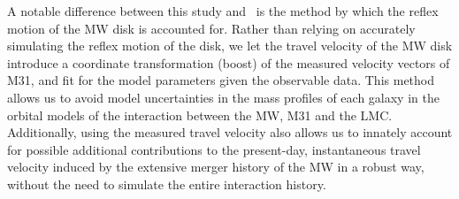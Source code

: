 \documentclass[twocolumn]{aastex631}
\begin{document}
A notable difference between this study and~\cite{Benisty2022} is the method by
which the reflex motion of the MW disk is accounted for.
Rather than relying on accurately simulating the reflex motion of the disk, we
let the travel velocity of the MW disk introduce a coordinate transformation
(boost) of the measured velocity vectors of M31, and fit for the model
parameters given the observable data.
This method allows us to avoid model uncertainties in the mass profiles of each
galaxy in the orbital models of the interaction between the MW, M31 and the LMC.
Additionally, using the measured travel velocity also allows us to innately
account for possible additional contributions to the present-day, instantaneous
travel velocity induced by the extensive merger history of the MW in a robust
way, without the need to simulate the entire interaction history.
\end{document}
